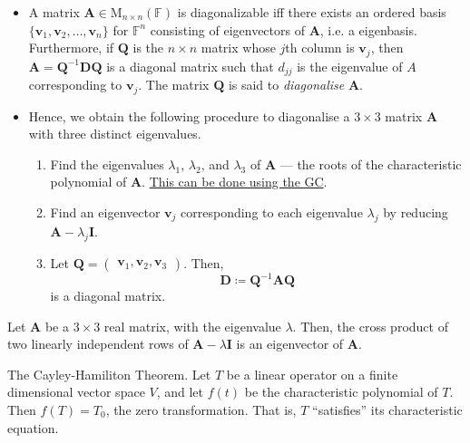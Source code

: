 \begin{stbox}{}
    \begin{itemize}
        \item A matrix \(\mathbf{A}\in\mathrm{M}_{n\times n}(\mathbb{F})\) is diagonalizable iff there exists an ordered basis \(\{\mathbf{v}_1,\mathbf{v}_2,\dots,\mathbf{v}_n\}\) for \(\mathbb{F}^n\) consisting of eigenvectors of \(\mathbf{A}\), i.e. a eigenbasis. Furthermore, if \(\mathbf{Q}\) is the \(n\times n\) matrix whose \(j\)th column is \(\mathbf{v}_j\), then \(\mathbf{A}=\mathbf{Q}^{-1}\mathbf{D}\mathbf{Q}\) is a diagonal matrix such that \(d_{jj}\) is the eigenvalue of \(A\) corresponding to \(\mathbf{v}_j\). The matrix \(\mathbf{Q}\) is said to \emph{diagonalise} \(\mathbf{A}\).
        \item Hence, we obtain the following procedure to diagonalise a \(3\times 3\) matrix \(\mathbf{A}\) with three distinct eigenvalues.
        \begin{enumerate}
            \item Find the eigenvalues \(\lambda_1\), \(\lambda_2\), and \(\lambda_3\) of \(\mathbf{A}\) --- the roots of the characteristic polynomial of \(\mathbf{A}\). \hyperlink{characteristic-polynomial-roots}{This can be done using the GC}.
            \item Find an eigenvector \(\mathbf{v}_j\) corresponding to each eigenvalue \(\lambda_j\) by reducing \(\mathbf{A}-\lambda_j\mathbf{I}
            \).
            \item Let \(\mathbf{Q}=
            \begin{pmatrix}
                \mathbf{v}_1,\mathbf{v}_2,\mathbf{v}_3
            \end{pmatrix}\). Then,
            \[\mathbf{D}\coloneq \mathbf{Q}^{-1}\mathbf{A}\mathbf{Q}\]
            is a diagonal matrix.
        \end{enumerate} 
    \end{itemize}    
\end{stbox}
\begin{note}
    Let \(\mathbf{A}\) be a \(3\times 3\) real matrix, with the eigenvalue \(\lambda\). Then, the cross product of two linearly independent rows of \(\mathbf{A}-\lambda \mathbf{I}\) is an eigenvector of \(\mathbf{A}\).
\end{note}
\begin{theorem}{The Cayley-Hamiliton Theorem.}{}
    Let \(T\) be a linear operator on a finite dimensional vector space \(V\), and let \(f(t)\) be the characteristic polynomial of \(T\). Then \(f(T)=T_0\), the zero transformation. That is, \(T\) ``satisfies'' its characteristic equation.
\end{theorem}
